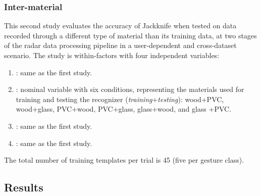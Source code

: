 \subsubsection{Inter-material} \label{sec:radar-experiments:through-materials:protocol:inter-material}
This second study evaluates the accuracy of Jackknife when tested on data recorded through a different type of material than its training data, at two stages of the radar data processing pipeline in a user-dependent and cross-dataset scenario. The study is within-factors with four independent variables:
\begin{enumerate}
    \item {}: same as the first study.
    \item {}: nominal variable with six conditions, representing the materials used for training and testing the recognizer (\textit{training}+\textit{testing}): wood+PVC, wood+glass, PVC+wood, PVC+glass, glass+wood, and glass +PVC.
    \item {}: same as the first study.
    \item {}: same as the first study.
\end{enumerate}
The total number of training templates per trial is 45 (five per gesture class).

\subsection{Results} \label{sec:radar-experiments:through-materials:results}


